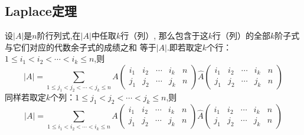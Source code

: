 \subsection{Laplace定理}
\begin{theorem}[$Laplace$定理]
  设$|A|$是$n$阶行列式,在$|A|$中任取$k$行（列）,
  那么包含于这$k$行（列）的全部$k$阶子式与它们对应的代数余子式的成绩之和
  等于$|A|$.即若取定$k$个行：$1 \leq i_1 < i_2 < \cdots < i_k \leq n$,则
  \begin{equation}
    \label{eq:1-6}
    |A|=\sum\limits_{1 \leq j_1 < j_2 < \cdots < j_k \leq n}
    A\begin{pmatrix}i_1 & i_2 & \cdots & i_k & n\\
        j_1 & j_2 & \cdots & j_k & n\end{pmatrix}
    \widehat{A}\begin{pmatrix}i_1 & i_2 & \cdots & i_k & n\\
        j_1 & j_2 & \cdots & j_k & n\end{pmatrix}
  \end{equation}
  同样若取定$k$个列：$1 \leq j_1 < j_2 < \cdots < j_k \leq n$,则
  \begin{equation}
    \label{eq:1-7}
    |A|=\sum\limits_{1 \leq i_1 < i_2 < \cdots < i_k \leq n}
    A\begin{pmatrix}i_1 & i_2 & \cdots & i_k & n\\
        j_1 & j_2 & \cdots & j_k & n\end{pmatrix}
    \widehat{A}\begin{pmatrix}i_1 & i_2 & \cdots & i_k & n\\
        j_1 & j_2 & \cdots & j_k & n\end{pmatrix}
  \end{equation}
\end{theorem}

